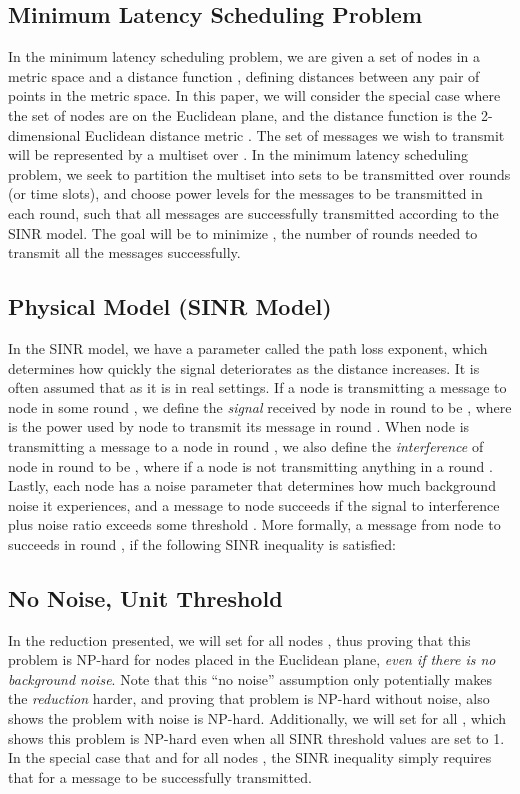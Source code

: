 \documentclass{article}
\begin{document}
\subsection{Minimum Latency Scheduling Problem}
In the minimum latency scheduling problem, we are given a set of nodes  in a metric space and a distance function , defining distances between any pair of points in the metric space.  In this paper, we will consider the special case where the set of nodes  are on the Euclidean plane, and the distance function is the 2-dimensional Euclidean distance metric .  The set of messages we wish to transmit will be represented by a multiset  over .  In the minimum latency scheduling problem, we seek to partition the multiset  into  sets  to be transmitted over  rounds (or time slots), and choose power levels for the messages to be transmitted in each round, such that all messages are successfully transmitted according to the SINR model.  The goal will be to minimize , the number of rounds needed to transmit all the messages successfully.

\subsection{Physical Model (SINR Model)}
In the SINR model, we have a parameter  called the path loss exponent, which determines how quickly the signal deteriorates as the distance increases. It is often assumed that  as it is in real settings.  If a node  is transmitting a message to node  in some round , we define the \emph{signal} received by node  in round  to be , where  is the power used by node  to transmit its message in round .  When node  is transmitting a message to a node  in round , we also define the \emph{interference} of node  in round  to be , where  if a node  is not transmitting anything in a round .  Lastly, each node  has a noise parameter  that determines how much background noise it experiences, and a message to node  succeeds if the signal to interference plus noise ratio exceeds some threshold .  More formally, a message from node  to  succeeds in round , if the following SINR inequality is satisfied:



\subsection{No Noise, Unit Threshold}
In the reduction presented, we will set  for all nodes , thus proving that this problem is NP-hard for nodes placed in the Euclidean plane, {\it even if there is no background noise}. Note that this ``no noise'' assumption only potentially makes the {\it reduction} harder, and proving that problem is NP-hard without noise, also shows the problem with noise is NP-hard.  Additionally, we will set  for all , which shows this problem is NP-hard even when all SINR threshold values are set to 1.  In the special case that  and  for all nodes , the SINR inequality simply requires that  for a message to be successfully transmitted.
\end{document}
